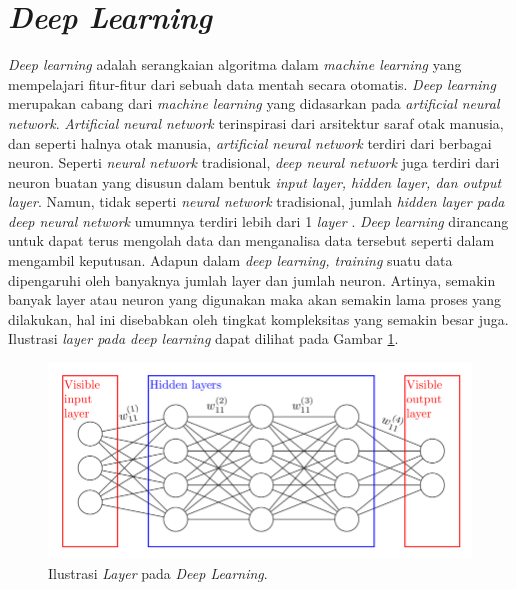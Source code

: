 \section{\textit{Deep Learning}}
\label{sec:deeplearning}
\textit{Deep learning} adalah serangkaian algoritma dalam \textit{machine learning} yang mempelajari fitur-fitur dari sebuah data mentah secara otomatis. \textit{Deep learning} merupakan cabang dari \textit{machine learning} yang didasarkan pada \textit{artificial neural network}. \textit{Artificial neural network} terinspirasi dari arsitektur saraf otak manusia, dan seperti halnya otak manusia, \textit{artificial neural network} terdiri dari berbagai neuron. Seperti \textit{neural network} tradisional, \textit{deep neural network} juga terdiri dari neuron buatan yang disusun dalam bentuk \textit{input layer, hidden layer, \textnormal{dan} output layer}. Namun, tidak seperti \textit{neural network} tradisional, jumlah \textit{hidden layer \textnormal{pada} deep neural network} umumnya terdiri lebih dari 1 \textit{layer} \citep*{ahmad2019deep}. 
\textit{Deep learning} dirancang untuk dapat terus mengolah data dan menganalisa data tersebut seperti dalam mengambil keputusan. 
Adapun dalam \textit{deep learning, training} suatu data dipengaruhi oleh banyaknya jumlah layer dan jumlah neuron. Artinya, semakin banyak layer atau neuron yang digunakan maka akan semakin lama proses yang dilakukan, hal ini disebabkan oleh tingkat kompleksitas yang semakin besar juga. Ilustrasi \textit{layer \textnormal{pada} deep learning} dapat dilihat pada Gambar \ref*{fig:deeplearninglayer}. \par

\begin{figure}[H]
    \centering
    \includegraphics[scale=0.5]{gambar/deep learning layer.png}
    \caption{Ilustrasi \textit{Layer} pada \textit{Deep Learning}.}
    \label{fig:deeplearninglayer}
\end{figure}

